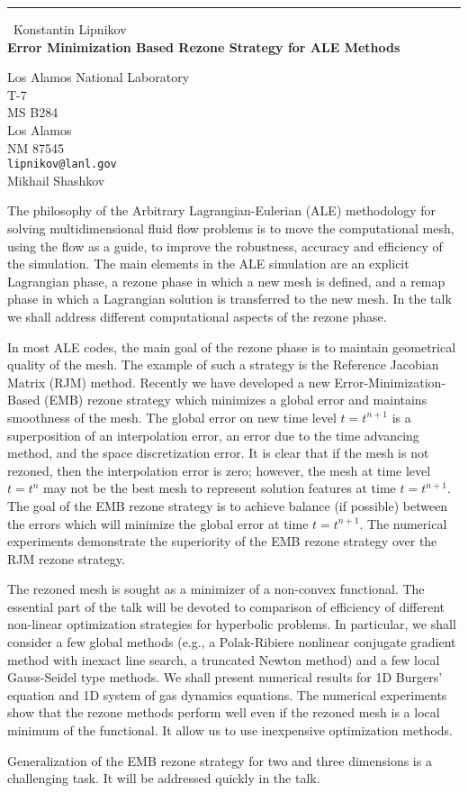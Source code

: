 \documentclass{report}
\begin{document}
\begin{center}
\rule{6in}{1pt} \
{\large Konstantin Lipnikov \\
{\bf Error Minimization Based Rezone Strategy for ALE Methods}}

Los Alamos National Laboratory \\ T-7 \\ MS B284 \\ Los Alamos \\ NM 87545
\\
{\tt lipnikov@lanl.gov}\\
Mikhail Shashkov\end{center}

The philosophy of the Arbitrary Lagrangian-Eulerian (ALE)
methodology for solving multidimensional fluid flow problems
is to move the computational mesh, using the flow as a guide,
to improve the robustness, accuracy and efficiency of the simulation. The
main elements in the ALE simulation are an
explicit Lagrangian phase, a rezone phase in which a new mesh
is defined, and a remap phase in which a Lagrangian solution
is transferred to the new mesh. In the talk we shall address
different computational aspects of the rezone phase.


In most ALE codes, the main goal of the rezone phase is to
maintain geometrical quality of the mesh. The example of such
a strategy is the Reference Jacobian Matrix (RJM) method.
Recently we have developed a new Error-Minimization-Based (EMB)
rezone strategy which minimizes a global error and maintains
smoothness of the mesh. The global error on new time level
$t=t^{n+1}$ is a superposition of an interpolation error, an
error due to the time advancing method, and the space
discretization error. It is clear that if the mesh is not rezoned,
then the interpolation error is zero; however, the mesh at time
level $t=t^n$ may not be the best mesh to represent solution features at
time $t=t^{n+1}$. The goal of the EMB rezone strategy is to achieve
balance (if possible) between the errors which will minimize the global
error at time $t=t^{n+1}$. The numerical experiments demonstrate the
superiority of the EMB rezone strategy over the RJM rezone strategy.


The rezoned mesh is sought as a minimizer of a non-convex functional. The
essential part of the talk will be devoted to comparison of efficiency of
different non-linear optimization strategies for hyperbolic problems. In
particular, we shall consider a few global methods (e.g., a Polak-Ribiere
nonlinear conjugate gradient method with inexact line search, a truncated
Newton method) and a few local Gauss-Seidel type methods. We shall
present numerical results for 1D Burgers' equation and 1D system of gas
dynamics equations. The numerical experiments show that the rezone
methods perform well even if the rezoned mesh is a local
minimum of the functional. It allow us to use inexpensive optimization methods.


Generalization of the EMB rezone strategy for two and three dimensions is
a challenging task. It will be addressed quickly in the talk.
\end{document}
